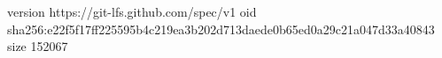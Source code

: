 version https://git-lfs.github.com/spec/v1
oid sha256:e22f5f17ff225595b4c219ea3b202d713daede0b65ed0a29c21a047d33a40843
size 152067
